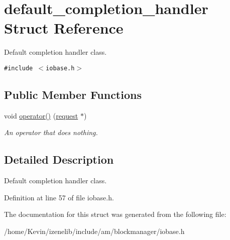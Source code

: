 \hypertarget{structdefault__completion__handler}{
\section{default\_\-completion\_\-handler Struct Reference}
\label{structdefault__completion__handler}
}
Default completion handler class.  


{\tt \#include $<$iobase.h$>$}

\subsection*{Public Member Functions}
\begin{CompactItemize}
\item 
\hypertarget{structdefault__completion__handler_3ae7a7551771dcdd6437929b805f5651}{
void \hyperlink{structdefault__completion__handler_3ae7a7551771dcdd6437929b805f5651}{operator()} (\hyperlink{classrequest}{request} $\ast$)}
\label{structdefault__completion__handler_3ae7a7551771dcdd6437929b805f5651}

\begin{CompactList}\small\item\em An operator that does nothing. \item\end{CompactList}\end{CompactItemize}


\subsection{Detailed Description}
Default completion handler class. 

Definition at line 57 of file iobase.h.

The documentation for this struct was generated from the following file:\begin{CompactItemize}
\item 
/home/Kevin/izenelib/include/am/blockmanager/iobase.h\end{CompactItemize}
